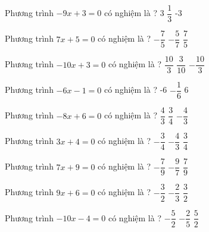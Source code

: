 \begin{ex} 
 Phương trình $-9x+3=0$ có nghiệm là ? 
 {3} 
 {\True $ \dfrac{ 1 }{ 3 } $} 
 {-3}  
 \loigiai{} 
 \end{ex} 
 
\begin{ex} 
 Phương trình $7x+5=0$ có nghiệm là ? 
 {$- \dfrac{ 7 }{ 5 } $} 
 {\True $- \dfrac{ 5 }{ 7 } $} 
 {$ \dfrac{ 7 }{ 5 } $}  
 \loigiai{} 
 \end{ex} 
 
\begin{ex} 
 Phương trình $-10x+3=0$ có nghiệm là ? 
 {$ \dfrac{ 10 }{ 3 } $} 
 {\True $ \dfrac{ 3 }{ 10 } $} 
 {$- \dfrac{ 10 }{ 3 } $}  
 \loigiai{} 
 \end{ex} 
 
\begin{ex} 
 Phương trình $-6x-1=0$ có nghiệm là ? 
 {-6} 
 {\True $- \dfrac{ 1 }{ 6 } $} 
 {6}  
 \loigiai{} 
 \end{ex} 
 
\begin{ex} 
 Phương trình $-8x+6=0$ có nghiệm là ? 
 {$ \dfrac{ 4 }{ 3 } $} 
 {\True $ \dfrac{ 3 }{ 4 } $} 
 {$- \dfrac{ 4 }{ 3 } $}  
 \loigiai{} 
 \end{ex} 
 
\begin{ex} 
 Phương trình $3x+4=0$ có nghiệm là ? 
 {$- \dfrac{ 3 }{ 4 } $} 
 {\True $- \dfrac{ 4 }{ 3 } $} 
 {$ \dfrac{ 3 }{ 4 } $}  
 \loigiai{} 
 \end{ex} 
 
\begin{ex} 
 Phương trình $7x+9=0$ có nghiệm là ? 
 {$- \dfrac{ 7 }{ 9 } $} 
 {\True $- \dfrac{ 9 }{ 7 } $} 
 {$ \dfrac{ 7 }{ 9 } $}  
 \loigiai{} 
 \end{ex} 
 
\begin{ex} 
 Phương trình $9x+6=0$ có nghiệm là ? 
 {$- \dfrac{ 3 }{ 2 } $} 
 {\True $- \dfrac{ 2 }{ 3 } $} 
 {$ \dfrac{ 3 }{ 2 } $}  
 \loigiai{} 
 \end{ex} 
 
\begin{ex} 
 Phương trình $-10x-4=0$ có nghiệm là ? 
 {$- \dfrac{ 5 }{ 2 } $} 
 {\True $- \dfrac{ 2 }{ 5 } $} 
 {$ \dfrac{ 5 }{ 2 } $}  
 \loigiai{} 
 \end{ex} 
 
